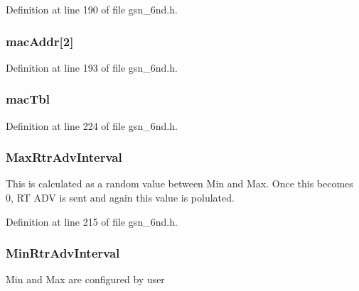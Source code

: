 Definition at line 190 of file gsn\_\-6nd.h.

\hypertarget{a00194_aeeaea6bb1ea47caa7e0601c6158f15de}{
\subsubsection[{macAddr}]{ {\bf macAddr}\mbox{[}2\mbox{]}}}
\label{a00194_aeeaea6bb1ea47caa7e0601c6158f15de}


Definition at line 193 of file gsn\_\-6nd.h.

\hypertarget{a00194_a60c15c88d71e3f6b96d97da9fe5322a6}{
\subsubsection[{macTbl}]{ {\bf macTbl}}}
\label{a00194_a60c15c88d71e3f6b96d97da9fe5322a6}


Definition at line 224 of file gsn\_\-6nd.h.

\hypertarget{a00194_ae3ebcc8321ee35e6297fd333661e089f}{
\subsubsection[{MaxRtrAdvInterval}]{ {\bf MaxRtrAdvInterval}}}
\label{a00194_ae3ebcc8321ee35e6297fd333661e089f}
This is calculated as a random value between Min and Max. Once this becomes 0, RT ADV is sent and again this value is polulated. 

Definition at line 215 of file gsn\_\-6nd.h.

\hypertarget{a00194_aa99832226388f64ed91a9d58bf2a862c}{
\subsubsection[{MinRtrAdvInterval}]{ {\bf MinRtrAdvInterval}}}
\label{a00194_aa99832226388f64ed91a9d58bf2a862c}
Min and Max are configured by user 


